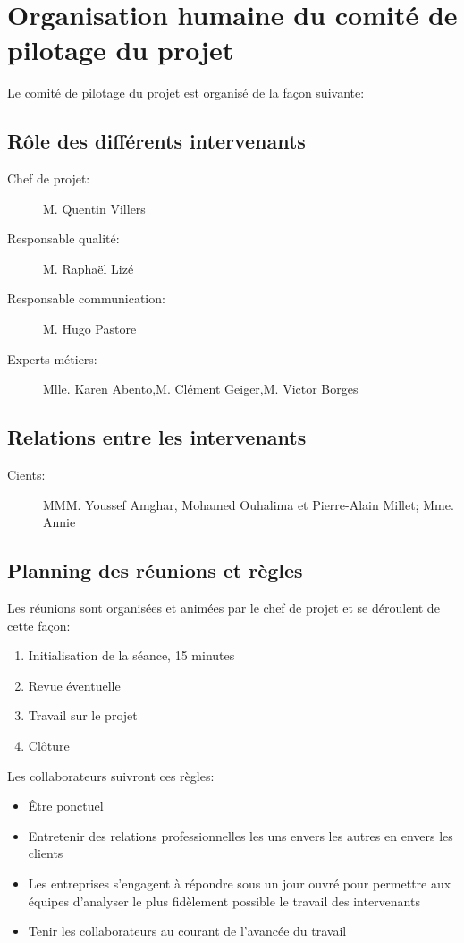 
\section{Organisation humaine du comité de pilotage du projet}

Le comité de pilotage du projet est organisé de la façon suivante:

    \subsection{Rôle des différents intervenants}
\begin{description}
\item[Chef de projet:]M. Quentin Villers
\item[Responsable qualité:]M. Raphaël Lizé
\item[Responsable communication:]M. Hugo Pastore
\item[Experts métiers:]Mlle. Karen Abento,M. Clément Geiger,M. Victor Borges
\end{description}

    \subsection{Relations entre les intervenants}
\begin{description}
\item[Cients:]MMM. Youssef Amghar, Mohamed Ouhalima et Pierre-Alain Millet; Mme. Annie
\end{description}

    \subsection{Planning des réunions et règles}
Les réunions sont organisées et animées par le chef de projet et se
déroulent de cette façon:
\begin{enumerate}
\item Initialisation de la séance, 15 minutes
\item Revue éventuelle
\item Travail sur le projet
\item Clôture
\end{enumerate}

Les collaborateurs suivront ces règles:
\begin{itemize}
\item Être ponctuel
\item Entretenir des relations professionnelles les uns envers les
        autres en envers les clients
\item Les entreprises s'engagent à répondre sous un jour ouvré pour 
        permettre aux équipes d'analyser le plus fidèlement possible
        le travail des intervenants
\item Tenir les collaborateurs au courant de l'avancée du travail
\end{itemize}
